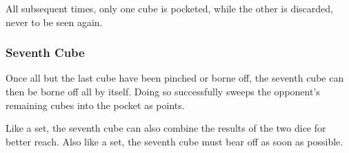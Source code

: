 All subsequent times, only one cube is pocketed, while the other is discarded, never to be seen again.

\subsubsection{Seventh Cube}
Once all but the last cube have been pinched or borne off, the seventh cube can then be borne off all by itself.
Doing so successfully sweeps the opponent's remaining cubes into the pocket as points.

Like a set, the seventh cube can also combine the results of the two dice for better reach.
Also like a set, the seventh cube must bear off as soon as possible.
